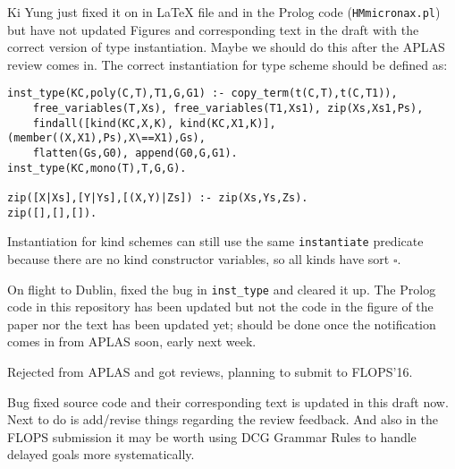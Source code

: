 \documentclass[runningheads,a4paper]{llncs}
\begin{document}
Ki Yung just fixed it on in LaTeX file and in the Prolog code
(\verb|HMmicronax.pl|) but have not updated Figures and corresponding text
in the draft with the correct version of type instantiation. Maybe we should
do this after the APLAS review comes in.
The correct instantiation for type scheme should be defined as:
\begin{verbatim}
inst_type(KC,poly(C,T),T1,G,G1) :- copy_term(t(C,T),t(C,T1)),
    free_variables(T,Xs), free_variables(T1,Xs1), zip(Xs,Xs1,Ps),
    findall([kind(KC,X,K), kind(KC,X1,K)],(member((X,X1),Ps),X\==X1),Gs),
    flatten(Gs,G0), append(G0,G,G1).
inst_type(KC,mono(T),T,G,G).

zip([X|Xs],[Y|Ys],[(X,Y)|Zs]) :- zip(Xs,Ys,Zs).
zip([],[],[]).
\end{verbatim}
Instantiation for kind schemes can still use the same \verb|instantiate|
predicate because there are no kind constructor variables, so  all kinds
have sort $\square$.

On flight to Dublin, fixed the bug in \verb|inst_type| and cleared it up.
The Prolog code in this repository has been updated but not the code
in the figure of the paper nor the text has been updated yet;
should be done once the notification comes in from APLAS soon,
early next week.

Rejected from APLAS and got reviews, planning to submit to FLOPS'16.

Bug fixed source code and their corresponding text is updated in this
draft now. Next to do is add/revise things regarding the review feedback.
And also in the FLOPS submission it may be worth using DCG Grammar Rules
to handle delayed goals more systematically.
\end{document}
